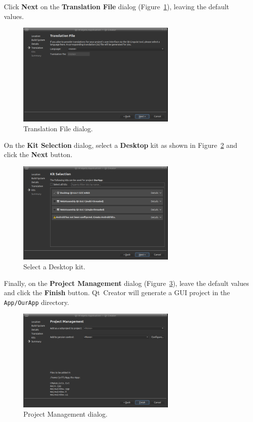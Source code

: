 \documentclass[letterpaper]{article}
\begin{document}
Click \textbf{Next} on the \textbf{Translation File} dialog (Figure~\ref{fig:create_ourapp_5}),
leaving the default values.
\begin{figure}[H]
  \centering
  \includegraphics[width=0.7\textwidth]{create_ourapp_5.png}
  \caption{Translation File dialog.}
  \label{fig:create_ourapp_5}
\end{figure}


On the \textbf{Kit Selection} dialog, select a \textbf{Desktop} kit as shown
in Figure~\ref{fig:create_ourapp_6} and click the \textbf{Next} button.
\begin{figure}[H]
  \centering
  \includegraphics[width=0.7\textwidth]{create_ourapp_6.png}
  \caption{Select a Desktop kit.}
  \label{fig:create_ourapp_6}
\end{figure}

Finally, on the \textbf{Project Management} dialog (Figure~\ref{fig:create_ourapp_7}), leave the default values
and click the \textbf{Finish} button. Qt~Creator will generate a GUI project
in the \verb|App/OurApp| directory.
\begin{figure}[H]
  \centering
  \includegraphics[width=0.7\textwidth]{create_ourapp_7.png}
  \caption{Project Management dialog.}
  \label{fig:create_ourapp_7}
\end{figure}
\end{document}
